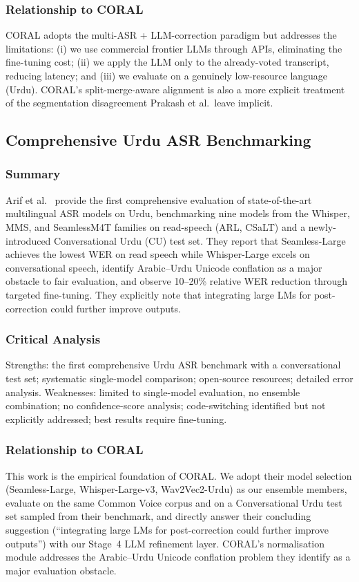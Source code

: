 \subsubsection{Relationship to CORAL}
CORAL adopts the multi-ASR + LLM-correction paradigm but addresses the limitations: (i) we use commercial frontier LLMs through APIs, eliminating the fine-tuning cost; (ii) we apply the LLM only to the already-voted transcript, reducing latency; and (iii) we evaluate on a genuinely low-resource language (Urdu). CORAL's split-merge-aware alignment is also a more explicit treatment of the segmentation disagreement Prakash et al.\ leave implicit.

\subsection{Comprehensive Urdu ASR Benchmarking}
\label{ssec:lit-arif}

\subsubsection{Summary}
Arif et al.~\cite{arif2024wer} provide the first comprehensive evaluation of state-of-the-art multilingual ASR models on Urdu, benchmarking nine models from the Whisper, MMS, and SeamlessM4T families on read-speech (ARL, CSaLT) and a newly-introduced Conversational Urdu (CU) test set. They report that Seamless-Large achieves the lowest WER on read speech while Whisper-Large excels on conversational speech, identify Arabic--Urdu Unicode conflation as a major obstacle to fair evaluation, and observe 10--20\% relative WER reduction through targeted fine-tuning. They explicitly note that integrating large LMs for post-correction could further improve outputs.

\subsubsection{Critical Analysis}
Strengths: the first comprehensive Urdu ASR benchmark with a conversational test set; systematic single-model comparison; open-source resources; detailed error analysis. Weaknesses: limited to single-model evaluation, no ensemble combination; no confidence-score analysis; code-switching identified but not explicitly addressed; best results require fine-tuning.

\subsubsection{Relationship to CORAL}
This work is the empirical foundation of CORAL. We adopt their model selection (Seamless-Large, Whisper-Large-v3, Wav2Vec2-Urdu) as our ensemble members, evaluate on the same Common Voice corpus and on a Conversational Urdu test set sampled from their benchmark, and directly answer their concluding suggestion (``integrating large LMs for post-correction could further improve outputs'') with our Stage~4 LLM refinement layer. CORAL's normalisation module addresses the Arabic--Urdu Unicode conflation problem they identify as a major evaluation obstacle.


